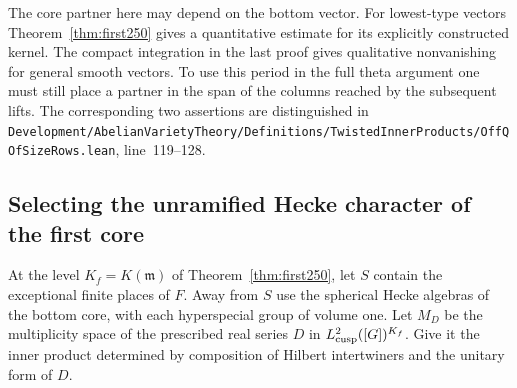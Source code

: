 \documentclass[a4paper,11pt]{article}
\theoremstyle{definition}
\theoremstyle{remark}
\newcommand{\srcloc}[2]{{\small\nolinkurl{#1.lean}}, line~#2}
\numberwithin{equation}{section}
\begin{document}
The core partner here may depend on the bottom vector. For lowest-type
vectors Theorem~\ref{thm:first250} gives a quantitative estimate for
its explicitly constructed kernel. The compact integration in the last
proof gives qualitative nonvanishing for general smooth vectors.
To use this period in the full theta argument one must still place a
partner in the span of the columns reached by the subsequent lifts.
The corresponding two assertions are distinguished in
\srcloc{Development/AbelianVarietyTheory/Definitions/TwistedInnerProducts/OffQOfSizeRows}{119--128}.

\subsection{Selecting the unramified Hecke character of the first core}\label{nav:V-34}
At the level \(K_f=K(\mathfrak m)\) of Theorem~\ref{thm:first250}, let
\(S\) contain the exceptional finite places of \(F\). Away from \(S\) use
the spherical Hecke algebras of the bottom core, with each hyperspecial
group of volume one. Let \(M_D\) be the multiplicity space of the
prescribed real series \(D\) in \(L^2_{\rm cusp}([G])^{K_f}\). Give it
the inner product determined by composition of Hilbert intertwiners and
the unitary form of \(D\).
\end{document}
